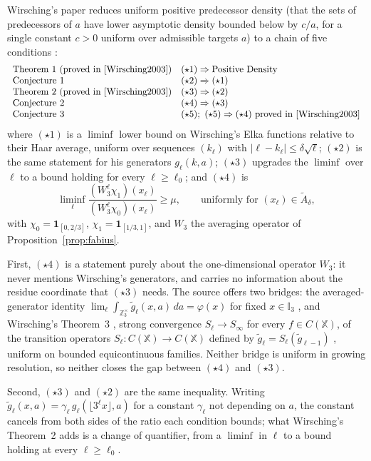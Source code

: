 \documentclass[11pt]{article}
\theoremstyle{remark}
\begin{document}
Wirsching's paper reduces uniform positive predecessor density (that
the sets of predecessors of $a$ have lower asymptotic density bounded
below by $c/a$, for a single constant $c>0$ uniform over admissible
targets $a$) to a chain of five conditions
\cite[Definition~1, \S\S1--7]{Wirsching2003}:
\[
\begin{array}{ll}
\text{Theorem 1 (proved in \cite{Wirsching2003})} & (\star1)\Rightarrow
  \text{Positive Density}\\
\text{Conjecture 1} & (\star2)\Rightarrow(\star1)\\
\text{Theorem 2 (proved in \cite{Wirsching2003})} & (\star3)\Rightarrow(\star2)\\
\text{Conjecture 2} & (\star4)\Rightarrow(\star3)\\
\text{Conjecture 3} & (\star5);\ (\star5)\Rightarrow(\star4)\text{ proved in
  \cite[\S7]{Wirsching2003}}
\end{array}
\]
where $(\star1)$ is a $\liminf$ lower bound on Wirsching's Elka functions
relative to their Haar average, uniform over sequences
$(k_\ell)$ with $|\ell-k_\ell|\le\delta\sqrt\ell$; $(\star2)$ is the same
statement for his generators $g_\ell(k,a)$; $(\star3)$ upgrades the
$\liminf$ over $\ell$ to a bound holding for every $\ell\ge\ell_0$;
and $(\star4)$ is
\[
 \liminf_\ell\frac{(W_3^\ell\chi_1)(x_\ell)}{(W_3^\ell\chi_0)(x_\ell)}
 \ge\mu,\qquad\text{uniformly for }(x_\ell)\in\widetilde A_\delta,
\]
with $\chi_0=\mathbf 1_{[0,2/3]}$, $\chi_1=\mathbf1_{[1/3,1]}$, and
$W_3$ the averaging operator of Proposition~\ref{prop:fabius}.

First, $(\star4)$ is a statement purely about the one-dimensional operator
$W_3$: it never mentions Wirsching's generators, and carries no
information about the residue coordinate that $(\star3)$ needs. The
source offers two bridges: the averaged-generator
identity $\lim_\ell\int_{\mathbb Z_3^\times}\widetilde g_\ell(x,a)\,da=
\varphi(x)$ for fixed $x\in\mathbb I_3$ \cite[\S6]{Wirsching2003}, and
Wirsching's Theorem~3 \cite[\S5]{Wirsching2003}, strong convergence
$S_\ell\to S_\infty$ for every $f\in C(\mathbb X)$, of the
transition operators $S_\ell:C(\mathbb X)\to C(\mathbb X)$ defined by
$\widetilde g_\ell=S_\ell(\widetilde g_{\ell-1})$
\cite[\S4]{Wirsching2003}, uniform on
bounded equicontinuous families. Neither bridge is uniform in growing
resolution, so neither closes the gap between $(\star4)$ and $(\star3)$.

Second, $(\star3)$ and $(\star2)$ are the same inequality. Writing
$\widetilde g_\ell(x,a)=\gamma_\ell\,g_\ell(\lfloor3^\ell
x\rfloor,a)$ for a constant $\gamma_\ell$ not depending on $a$, the
constant cancels from both sides of the ratio each condition bounds;
what Wirsching's Theorem~2 adds is a change of quantifier, from a
$\liminf$ in $\ell$ to a bound holding at every $\ell\ge\ell_0$.
\end{document}
